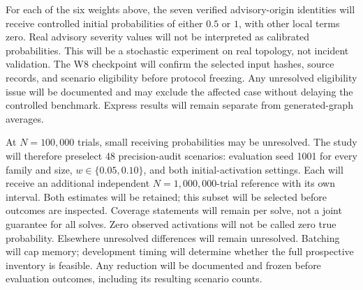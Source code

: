 For each of the six weights above, the seven verified advisory-origin
identities will receive controlled initial probabilities of either $0.5$
or $1$, with other local terms zero. Real advisory severity values will
not be interpreted as calibrated probabilities. This will be a stochastic
experiment on real topology, not incident validation. The W8 checkpoint
will confirm the selected input hashes, source records, and scenario
eligibility before protocol freezing. Any unresolved eligibility issue
will be documented and may exclude the affected case without delaying
the controlled benchmark. Express results will remain separate from
generated-graph averages.

At $N=100{,}000$ trials, small receiving probabilities may be unresolved.
The study will therefore preselect 48 precision-audit scenarios: evaluation
seed 1001 for every family and size, $w\in\{0.05,0.10\}$, and both
initial-activation settings. Each will receive an additional independent
$N=1{,}000{,}000$-trial reference with its own interval. Both estimates
will be retained; this subset will be selected before outcomes are inspected.
Coverage statements will remain per solve, not a joint guarantee for all
solves. Zero observed activations will not be called zero true probability.
Elsewhere unresolved differences will remain unresolved. Batching will cap
memory; development timing will determine whether the full prospective
inventory is feasible. Any reduction will be documented and frozen before
evaluation outcomes, including its resulting scenario counts.

